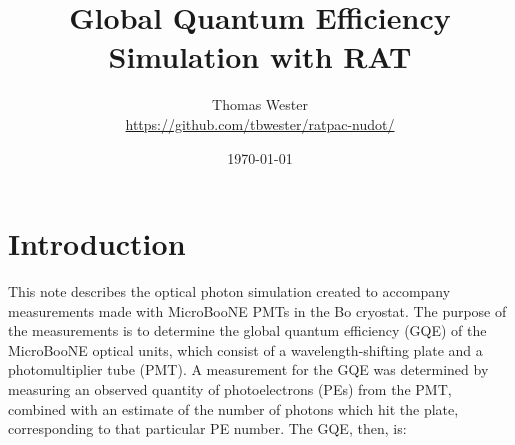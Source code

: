 \documentclass[aps,pra,notitlepage,groupedaddress]{revtex4-1}
\begin{document}

\title{Global Quantum Efficiency Simulation with RAT}


\author{Thomas Wester \\ \small{\href{https://github.com/tbwester/ratpac-nudot/}{https://github.com/tbwester/ratpac-nudot/}}}

\affiliation{}


\date{\today}

\maketitle

\tableofcontents

\section{Introduction}

This note describes the optical photon simulation created to accompany measurements made with MicroBooNE PMTs in the Bo cryostat. The purpose of the measurements is to determine the global quantum efficiency (GQE) of the MicroBooNE optical units, which consist of a wavelength-shifting plate and a photomultiplier tube (PMT). A measurement for the GQE was determined by measuring an observed quantity of photoelectrons (PEs) from the PMT, combined with an estimate of the number of photons which hit the plate, corresponding to that particular PE number. The GQE, then, is:
\end{document}
